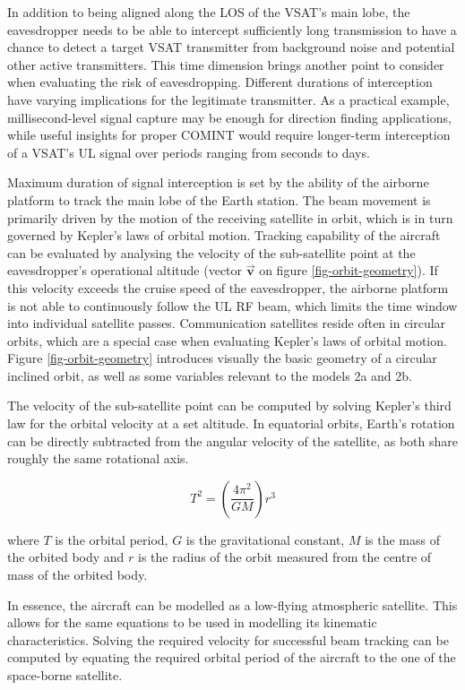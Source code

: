 \documentclass[english, 12pt, a4paper, elec, utf8, a-1b, online]{aaltothesis}
\begin{document}
In addition to being aligned along the LOS of the VSAT's main lobe, the eavesdropper needs to be able to intercept sufficiently long transmission to have a chance to detect a target VSAT transmitter from background noise and potential other active transmitters.
This time dimension brings another point to consider when evaluating the risk of eavesdropping.
Different durations of interception have varying implications for the legitimate transmitter.
As a practical example, millisecond-level signal capture may be enough for direction finding applications, while useful insights for proper COMINT would require longer-term interception of a VSAT's UL signal over periods ranging from seconds to days.

Maximum duration of signal interception is set by the ability of the airborne platform to track the main lobe of the Earth station.
The beam movement is primarily driven by the motion of the receiving satellite in orbit, which is in turn governed by Kepler's laws of orbital motion.
Tracking capability of the aircraft can be evaluated by analysing the velocity of the sub-satellite point at the eavesdropper's operational altitude (vector $\bm{\vec{v}}$ on figure \ref{fig-orbit-geometry}).
If this velocity exceeds the cruise speed of the eavesdropper, the airborne platform is not able to continuously follow the UL RF beam, which limits the time window into individual satellite passes.
Communication satellites reside often in circular orbits, which are a special case when evaluating Kepler's laws of orbital motion.
Figure \ref*{fig-orbit-geometry} introduces visually the basic geometry of a circular inclined orbit, as well as some variables relevant to the models 2a and 2b.

The velocity of the sub-satellite point can be computed by solving Kepler's third law for the orbital velocity at a set altitude.
In equatorial orbits, Earth's rotation can be directly subtracted from the angular velocity of the satellite, as both share roughly the same rotational axis.

\begin{equation} \label{eq-kepler-3}
  T^2 = (\frac{4\pi^2}{GM})r^3
\end{equation}

where $T$ is the orbital period, $G$ is the gravitational constant, $M$ is the mass of the orbited body and $r$ is the radius of the orbit measured from the centre of mass of the orbited body.

In essence, the aircraft can be modelled as a low-flying atmospheric satellite.
This allows for the same equations to be used in modelling its kinematic characteristics.
Solving the required velocity for successful beam tracking can be computed by equating the required orbital period of the aircraft to the one of the space-borne satellite.
\end{document}
